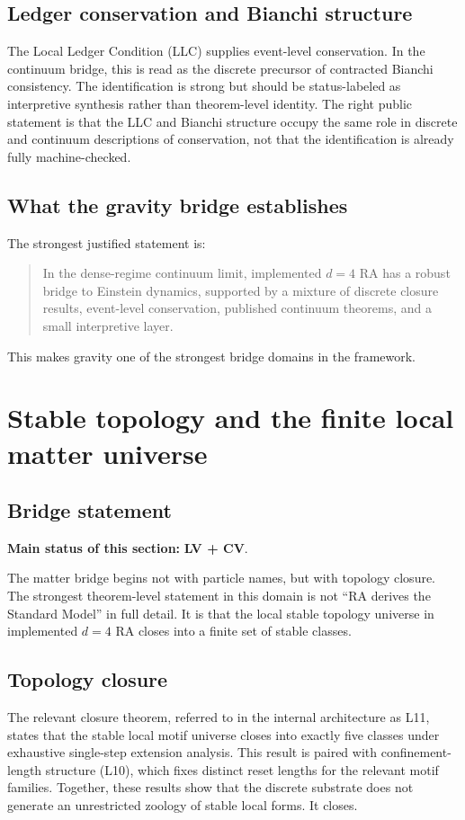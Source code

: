 \documentclass[11pt]{article}
\begin{document}
\subsection{Ledger conservation and Bianchi structure}
The Local Ledger Condition (LLC) supplies event-level conservation. In the continuum bridge, this is read as the discrete precursor of contracted Bianchi consistency. The identification is strong but should be status-labeled as interpretive synthesis rather than theorem-level identity. The right public statement is that the LLC and Bianchi structure occupy the same role in discrete and continuum descriptions of conservation, not that the identification is already fully machine-checked.

\subsection{What the gravity bridge establishes}
The strongest justified statement is:
\begin{quote}
In the dense-regime continuum limit, implemented $d=4$ RA has a robust bridge to Einstein dynamics, supported by a mixture of discrete closure results, event-level conservation, published continuum theorems, and a small interpretive layer.
\end{quote}
This makes gravity one of the strongest bridge domains in the framework.

\section{Stable topology and the finite local matter universe}\label{sec:stable-topology}
\subsection{Bridge statement}
\textbf{Main status of this section:} \textbf{LV + CV}.

The matter bridge begins not with particle names, but with topology closure. The strongest theorem-level statement in this domain is not ``RA derives the Standard Model'' in full detail. It is that the local stable topology universe in implemented $d=4$ RA closes into a finite set of stable classes.

\subsection{Topology closure}
The relevant closure theorem, referred to in the internal architecture as L11, states that the stable local motif universe closes into exactly five classes under exhaustive single-step extension analysis. This result is paired with confinement-length structure (L10), which fixes distinct reset lengths for the relevant motif families. Together, these results show that the discrete substrate does not generate an unrestricted zoology of stable local forms. It closes.
\end{document}

